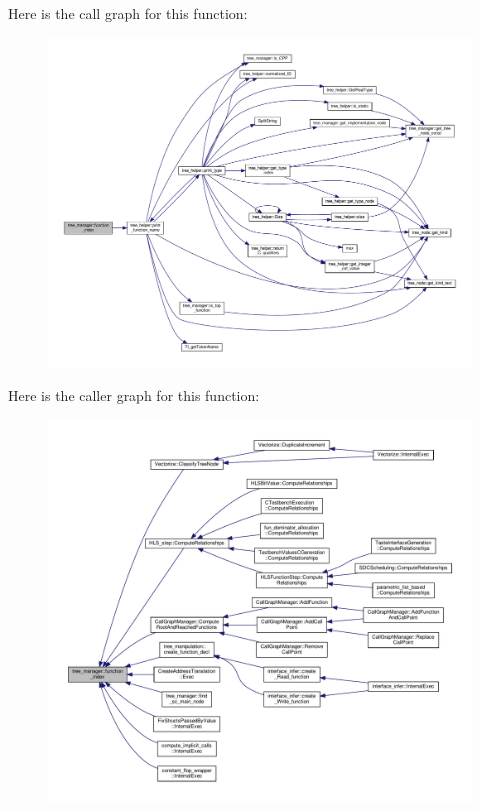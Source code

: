 Here is the call graph for this function\+:
\nopagebreak
\begin{figure}[H]
\begin{center}
\leavevmode
\includegraphics[width=350pt]{d2/ddd/classtree__manager_aada163f9f7e3d56944cb7b4d73329609_cgraph}
\end{center}
\end{figure}
Here is the caller graph for this function\+:
\nopagebreak
\begin{figure}[H]
\begin{center}
\leavevmode
\includegraphics[width=350pt]{d2/ddd/classtree__manager_aada163f9f7e3d56944cb7b4d73329609_icgraph}
\end{center}
\end{figure}
\mbox{\label{classtree__manager_a367b3631b5e4af322d4ead5fdf56ec90}} 
